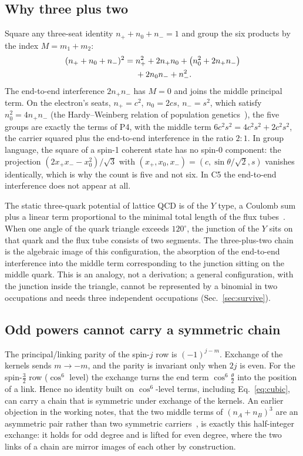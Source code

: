 \documentclass[%
 reprint, amsmath,amssymb, aps, prb, ]{revtex4-2}
\numberwithin{equation}{section}
\begin{document}
\subsection{Why three plus two}
\label{sec:threeplustwo}

Square any three-seat identity $n_++n_0+n_-=1$ and group the six products by the index $M=m_1+m_2$:
\begin{align}
(n_++n_0+n_-)^2=\;&n_+^2+2n_+n_0+\big(n_0^2+2n_+n_-\big)
\notag\\
&+2n_0n_-+n_-^2 .
\label{eq:Mgroup}
\end{align}
The end-to-end interference $2n_+n_-$ has $M=0$ and joins the middle principal term. On the electron's seats, $n_+=c^2$, $n_0=2cs$, $n_-=s^2$, which satisfy $n_0^2=4n_+n_-$ (the Hardy--Weinberg relation of population genetics~\cite{ref:hardy}), the five groups are exactly the terms of P4, with the middle term $6c^2s^2=4c^2s^2+2c^2s^2$, the carrier squared plus the end-to-end interference in the ratio $2{:}1$. In group language, the square of a spin-1 coherent state has no spin-0 component: the projection $(2x_+x_--x_0^2)/\sqrt3$ with $(x_+,x_0,x_-)=(c,\sin\theta/\sqrt2,s)$ vanishes identically, which is why the count is five and not six. In C5 the end-to-end interference does not appear at all.

The static three-quark potential of lattice QCD is of the $Y$ type, a Coulomb sum plus a linear term proportional to the minimal total length of the flux tubes~\cite{ref:takahashi01,ref:takahashi02}. When one angle of the quark triangle exceeds $120^\circ$, the junction of the $Y$ sits on that quark and the flux tube consists of two segments. The three-plus-two chain is the algebraic image of this configuration, the absorption of the end-to-end interference into the middle term corresponding to the junction sitting on the middle quark. This is an analogy, not a derivation; a general configuration, with the junction inside the triangle, cannot be represented by a binomial in two occupations and needs three independent occupations (Sec.~\ref{sec:survive}).

\subsection{Odd powers cannot carry a symmetric chain}
\label{sec:odd}

The principal/linking parity of the spin-$j$ row is $(-1)^{j-m}$. Exchange of the kernels sends $m\to-m$, and the parity is invariant only when $2j$ is even. For the spin-$\frac32$ row ($\cos^6$ level) the exchange turns the end term $\cos^6\frac{\theta}{2}$ into the position of a link. Hence no identity built on $\cos^6$-level terms, including Eq.~\eqref{eq:cubic}, can carry a chain that is symmetric under exchange of the kernels. An earlier objection in the working notes, that the two middle terms of $(n_A+n_B)^3$ are an asymmetric pair rather than two symmetric carriers~\cite{ref:trunks}, is exactly this half-integer exchange: it holds for odd degree and is lifted for even degree, where the two links of a chain are mirror images of each other by construction.
\end{document}
